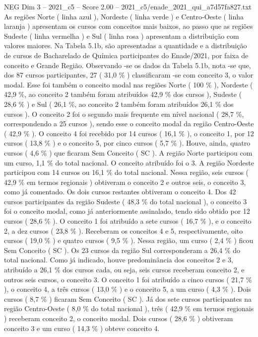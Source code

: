\begin{textsample}{NEG Dim 3 – 2021\_c5 – Score 2.00 – 2021\_c5/enade\_2021\_qui\_a7d57fa827.txt}
As regiões Norte ( linha azul ), Nordeste ( linha verde ) e Centro-Oeste ( linha laranja ) apresentam os cursos com conceitos mais baixos, ao passo que as regiões Sudeste ( linha vermelha ) e Sul ( linha rosa ) apresentam a distribuição com valores maiores.
Na Tabela 5.1b, são apresentadas a quantidade e a distribuição de cursos de Bacharelado de Química participantes do Enade/2021, por faixa de conceito e Grande Região.
Observando -se os dados da Tabela 5.1b, nota -se que, dos 87 cursos participantes, 27 ( 31,0 \% ) classificaram -se com conceito 3, o valor modal.
Esse foi também o conceito modal nas regiões Norte ( 100 \% ), Nordeste ( 42,9 \%, ao conceito 2 também foram atribuídos 42,9 \% dos cursos ), Sudeste ( 28,6 \% ) e Sul ( 26,1 \%, ao conceito 2 também foram atribuídos 26,1 \% dos cursos ).
O conceito 2 foi o segundo mais frequente em nível nacional ( 28,7 \%, correspondendo a 25 cursos ), sendo esse o conceito modal da região Centro-Oeste ( 42,9 \% ).
O conceito 4 foi recebido por 14 cursos ( 16,1 \% ), o conceito 1, por 12 cursos ( 13,8 \% ) e o conceito 5, por cinco cursos ( 5,7 \% ).
Houve, ainda, quatro cursos ( 4,6 \% ) que ficaram Sem Conceito ( SC ).
A região Norte participou com um curso, 1,1 \% do total nacional.
O conceito atribuído foi o 3.
A região Nordeste participou com 14 cursos ou 16,1 \% do total nacional.
Nessa região, seis cursos ( 42,9 \% em termos regionais ) obtiveram o conceito 2 e outros seis, o conceito 3, como já comentado.
Os dois cursos restantes obtiveram o conceito 4.
Dos 42 cursos participantes da região Sudeste ( 48,3 \% do total nacional ), o conceito 3 foi o conceito modal, como já anteriormente assinalado, tendo sido obtido por 12 cursos ( 28,6 \% ).
O conceito 1 foi atribuído a sete cursos ( 16,7 \% ), e o conceito 2, a dez cursos ( 23,8 \% ).
Receberam os conceitos 4 e 5, respectivamente, oito cursos ( 19,0 \% ) e quatro cursos ( 9,5 \% ).
Nessa região, um curso ( 2,4 \% ) ficou Sem Conceito ( SC ).
Os 23 cursos da região Sul corresponderam a 26,4 \% do total nacional.
Como já indicado, houve predominância dos conceitos 2 e 3, atribuído a 26,1 \% dos cursos cada, ou seja, seis cursos receberam conceito 2, e outros seis cursos, o conceito 3.
O conceito 1 foi atribuído a cinco cursos ( 21,7 \% ), o conceito 4, a três cursos ( 13,0 \% ) e o conceito 5, a um curso ( 4,3 \% ).
Dois cursos ( 8,7 \% ) ficaram Sem Conceito ( SC ).
Já dos sete cursos participantes na região Centro-Oeste ( 8,0 \% do total nacional ), três ( 42,9 \% em termos regionais ) receberam conceito 2, o conceito modal.
Dois cursos ( 28,6 \% ) obtiveram conceito 3 e um curso ( 14,3 \% ) obteve conceito 4.

\end{textsample}
